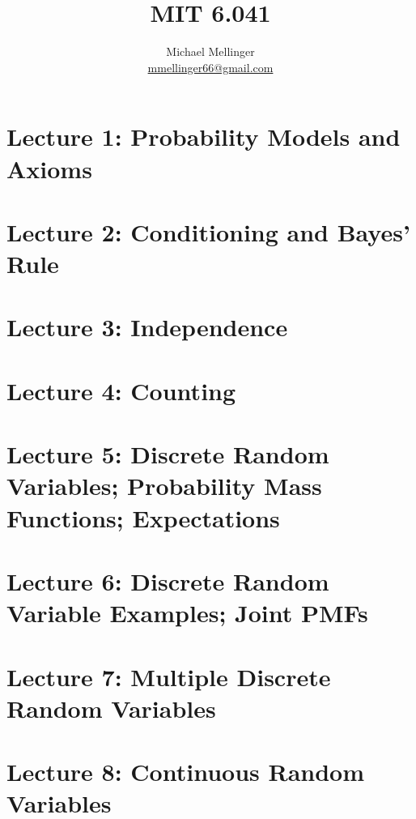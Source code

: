 \documentclass{article}
\title{MIT 6.041}
\author{Michael Mellinger \\ \href{mailto:mmellinger66@gmail.com}{mmellinger66@gmail.com} }
\begin{document}
\maketitle
\tableofcontents
\pagebreak

\section{Lecture 1: Probability Models and Axioms}



\section{Lecture 2: Conditioning and Bayes' Rule}



\section{Lecture 3: Independence}



\section{Lecture 4: Counting}



\section{Lecture 5: Discrete Random Variables; Probability Mass Functions; Expectations}



\section{Lecture 6: Discrete Random Variable Examples; Joint PMFs}



\section{Lecture 7: Multiple Discrete Random Variables}



\section{Lecture 8: Continuous Random Variables}
\end{document}

